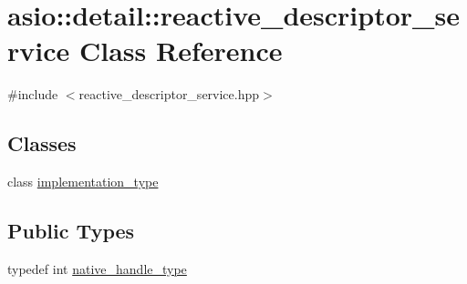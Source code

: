 \hypertarget{classasio_1_1detail_1_1reactive__descriptor__service}{}\section{asio\+:\+:detail\+:\+:reactive\+\_\+descriptor\+\_\+service Class Reference}
\label{classasio_1_1detail_1_1reactive__descriptor__service}


{\ttfamily \#include $<$reactive\+\_\+descriptor\+\_\+service.\+hpp$>$}

\subsection*{Classes}
\begin{DoxyCompactItemize}
\item 
class \hyperlink{classasio_1_1detail_1_1reactive__descriptor__service_1_1implementation__type}{implementation\+\_\+type}
\end{DoxyCompactItemize}
\subsection*{Public Types}
\begin{DoxyCompactItemize}
\item 
typedef int \hyperlink{classasio_1_1detail_1_1reactive__descriptor__service_af59f442d3eb8d39ffa9e7787b9fb0731}{native\+\_\+handle\+\_\+type}
\end{DoxyCompactItemize}
